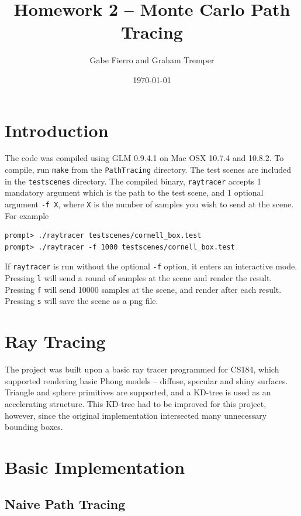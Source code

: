 \documentclass[11pt]{article}
\begin{document}
\title{Homework 2 -- Monte Carlo Path Tracing}
\author{Gabe Fierro and Graham Tremper}
\date{\today}
\maketitle

\section{Introduction}

The code was compiled using GLM 0.9.4.1 on Mac OSX 10.7.4 and 10.8.2. To compile, run \verb`make` from
the \verb`PathTracing` directory. The test scenes are included in the \verb`testscenes` directory. The
compiled binary, \verb`raytracer` accepts 1 mandatory argument which is the path to the test scene, and
1 optional argument \verb`-f X`, where \verb`X` is the number of samples you wish to send at the scene.
For example

\begin{verbatim}
prompt> ./raytracer testscenes/cornell_box.test
prompt> ./raytracer -f 1000 testscenes/cornell_box.test
\end{verbatim}

If \verb`raytracer` is run without the optional \verb`-f` option, it enters an interactive mode. Pressing \verb`l`
will send a round of samples at the scene and render the result. Pressing \verb`f` will send 10000 samples
at the scene, and render after each result. Pressing \verb`s` will save the scene as a png file.

\section{Ray Tracing}

The project was built upon a basic ray tracer programmed for CS184, which supported rendering basic Phong models -- diffuse, specular and shiny surfaces. Triangle and sphere primitives are supported, and a KD-tree is used as an accelerating structure. This KD-tree had to be improved for this project, however, since the original implementation intersected many unnecessary bounding boxes. 

\section{Basic Implementation}

\subsection{Naive Path Tracing}
\end{document}
